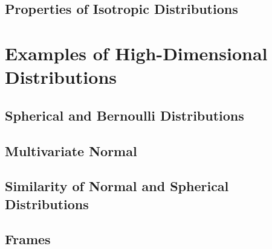 \documentclass{report}
\theoremstyle{definition}
\newenvironment{exercise}[1]{
  \renewcommand\theexerciseimpl{#1}
  \exerciseimpl
}{\endexerciseimpl}
\begin{document}
\subsection{Properties of Isotropic Distributions}

\begin{exercise}{3.2.6}
\end{exercise}

\section{Examples of High-Dimensional Distributions}

\subsection{Spherical and Bernoulli Distributions}

\begin{exercise}{3.3.1}
\end{exercise}

\subsection{Multivariate Normal}

\begin{exercise}{3.3.3}
\end{exercise}

\begin{exercise}{3.3.4}
\end{exercise}

\begin{exercise}{3.3.5}
\end{exercise}

\begin{exercise}{3.3.6}
\end{exercise}

\subsection{Similarity of Normal and Spherical Distributions}

\begin{exercise}{3.3.7}
\end{exercise}

\subsection{Frames}

\begin{exercise}{3.3.9}
\end{exercise}
\end{document}
